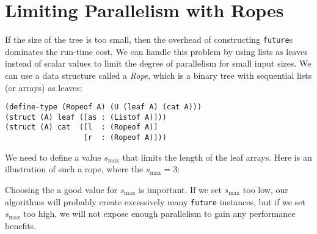 \documentclass{article}
\begin{document}
\section{Limiting Parallelism with Ropes}

If the size of the tree is too small, then the overhead of constructing \lstinline{future}s dominates the run-time cost. We can handle this problem by using lists as leaves instead of scalar values to limit the degree of parallelism for small input sizes. We can use a data structure called a \emph{Rope}, which is a binary tree with sequential lists (or arrays) as leaves:

\begin{lstlisting}
(define-type (Ropeof A) (U (leaf A) (cat A)))
(struct (A) leaf ([as : (Listof A)]))
(struct (A) cat  ([l  : (Ropeof A)]
                  [r  : (Ropeof A)]))
\end{lstlisting}

We need to define a value $s_{\max}$ that limits the length of the leaf arrays. Here is an illustration of such a rope, where the $s_{\max} = 3$:

\begin{center}
\end{center}

Choosing the a good value for $s_{\max}$ is important. If we set $s_{\max}$ too low, our algorithms will probably create excessively many \lstinline{future} instances, but if we set $s_{\max}$ too high, we will not expose enough parallelism to gain any performance benefits.
\end{document}
